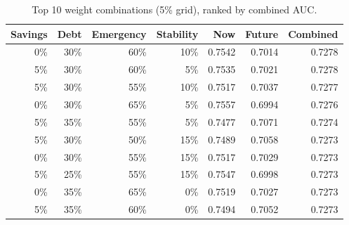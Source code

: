 \begin{table}[htbp]
\centering
\small
\caption{Top 10 weight combinations (5\% grid), ranked by combined AUC.}
\label{tab:grid}
\begin{tabular}{rrrrrrr}
\toprule
Savings & Debt & Emergency & Stability & Now & Future & Combined \\
\midrule
0\% & 30\% & 60\% & 10\% & 0.7542 & 0.7014 & 0.7278 \\
5\% & 30\% & 60\% & 5\% & 0.7535 & 0.7021 & 0.7278 \\
5\% & 30\% & 55\% & 10\% & 0.7517 & 0.7037 & 0.7277 \\
0\% & 30\% & 65\% & 5\% & 0.7557 & 0.6994 & 0.7276 \\
5\% & 35\% & 55\% & 5\% & 0.7477 & 0.7071 & 0.7274 \\
5\% & 30\% & 50\% & 15\% & 0.7489 & 0.7058 & 0.7273 \\
0\% & 30\% & 55\% & 15\% & 0.7517 & 0.7029 & 0.7273 \\
5\% & 25\% & 55\% & 15\% & 0.7547 & 0.6998 & 0.7273 \\
0\% & 35\% & 65\% & 0\% & 0.7519 & 0.7027 & 0.7273 \\
5\% & 35\% & 60\% & 0\% & 0.7494 & 0.7052 & 0.7273 \\
\bottomrule
\end{tabular}
\end{table}
